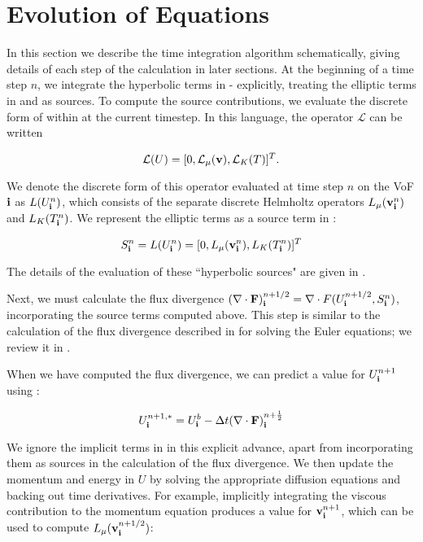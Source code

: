 \section{Evolution of Equations\label{sec:Evolution}}

In this section we describe the time integration algorithm schematically, 
giving details of each step of the calculation in later sections.
At the beginning of a time step $n$, we integrate the hyperbolic terms in 
 -  explicitly, treating the elliptic terms in 
 and  as sources. To compute the source 
contributions, we evaluate the discrete form of  within  at
the current timestep.  In this language, the operator $\mathcal{L}$ can 
be written

\begin{equation}
\mathcal{L}(U) = [0, \mathcal{L}_\mu(\mathbf{v}), \mathcal{L}_K(T)]^T. \label{eq:LU}
\end{equation}

\noindent
We denote the discrete form of this operator evaluated at time step $n$ on the 
VoF ${\bf i}$ as $L(U^n_{\bf i})$, which consists of the separate discrete Helmholtz 
operators $L_\mu(\mathbf{v}^n_{\bf i})$ and $L_K(T^n_{\bf i})$. We represent the 
elliptic terms as a source term in :

\begin{equation}
S^n_{\bf i} = L(U^n_{\bf i}) = [0, L_\mu(\mathbf{v}^n_{\bf i}), L_K(T^n_{\bf i})]^T \label{eq:hyperbolicSources}
\end{equation}

The details of the evaluation of these ``hyperbolic sources" are given in 
.

Next, we must calculate the flux divergence 
$(\nabla\cdot{\mathbf{F}})^{n+1/2}_{\bf i} = \nabla\cdot{F}(U^{n+1/2}_{\bf i}, S^n_{\bf i})$,
incorporating the source terms computed above. This step is similar to the 
calculation of the flux divergence described in \cite{???} for solving the 
Euler equations; we review it in . 

When we have computed the flux divergence, we can predict a value for 
$U^{n+1}_{\bf i}$ using :

\begin{equation}
U^{n+1,*}_{\bf i} = U^b_{\bf i} - \Delta t(\nabla\cdot{\mathbf{F}})^{n+\frac{1}{2}}_{\bf i}
\end{equation}

\noindent
We ignore the implicit terms in  in this explicit 
advance, apart from incorporating them as sources in the calculation of the 
flux divergence. We then update the momentum and energy in $U$ by solving the 
appropriate diffusion equations and backing out time derivatives. For example, 
implicitly integrating the viscous contribution to the momentum equation 
produces a value for $\mathbf{v}^{n+1}_{\bf i}$, which can be used to compute 
$L_\mu(\mathbf{v}^{n+1/2}_{\bf i})$:

